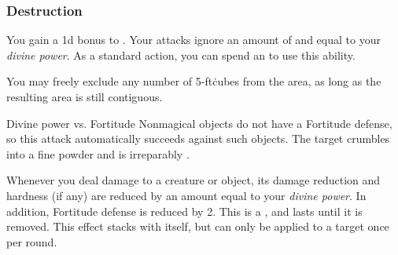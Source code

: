         \subsubsection{Destruction}
             You gain a \plus1d bonus to .
             Your attacks ignore an amount of  and  equal to your \textit{divine power}.
             As a standard action, you can spend an  to use this ability.
            \begin{ability}
                \begin{spelltargetinginfo}
                    \spellspecial You may freely exclude any number of 5-ft\. cubes from the area, as long as the resulting area is still contiguous.
                \end{spelltargetinginfo}
                \begin{spelleffects}
                    \begin{spellattack}{Divine power vs. Fortitude}
                        \spellspecial Nonmagical objects do not have a Fortitude defense, so this attack automatically succeeds against such objects.
                        \spellsuccess The target crumbles into a fine powder and is irreparably .
                    \end{spellattack}
                \end{spelleffects}
            \end{ability}
             Whenever you deal damage to a creature or object, its damage reduction and hardness (if any) are reduced by an amount equal to your \textit{divine power}.
            In addition, Fortitude defense is reduced by 2.
            This is a , and lasts until it is removed.
            This effect stacks with itself, but can only be applied to a target once per round.

